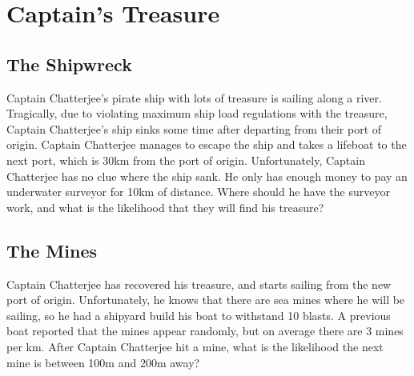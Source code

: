 \documentclass{exam}
\begin{document}
\section{Captain's Treasure}
\subsection{The Shipwreck}
Captain Chatterjee's pirate ship with lots of treasure is sailing along a river. Tragically, due to violating maximum ship load regulations with the treasure, Captain Chatterjee's ship sinks some time after departing from their port of origin. Captain Chatterjee manages to escape the ship and takes a lifeboat to the next port, which is 30km from the port of origin. Unfortunately, Captain Chatterjee has no clue where the ship sank. He only has enough money to pay an underwater surveyor for 10km of distance. Where should he have the surveyor work, and what is the likelihood that they will find his treasure?
\vspace{7cm}

\subsection{The Mines}
Captain Chatterjee has recovered his treasure, and starts sailing from the new port of origin. Unfortunately, he knows that there are sea mines where he will be sailing, so he had a shipyard build his boat to withstand 10 blasts. A previous boat reported that the mines appear randomly, but on average there are 3 mines per km. After Captain Chatterjee hit a mine, what is the likelihood the next mine is between 100m and 200m away?
\vspace{7cm}


\end{document}
